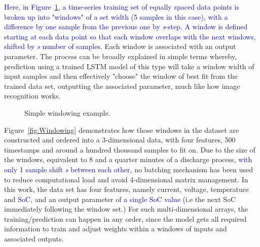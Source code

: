 %
%
\textcolor{blue}{Here, in Figure~\ref{fig:windowing_simple}, a time-series training set of equally spaced data points is broken up into "windows" of a set width (5 samples in this case), with a difference by one sample from the previous one by \textit{s}-step.
A window is defined starting at each data point so that each window overlaps with the next windows, shifted by \textit{s} number of samples.}
Each window is associated with an output parameter.
The process can be broadly explained in simple terms whereby, prediction using a trained LSTM model of this type will take a window width of input samples and then effectively "choose" the window of best fit from the trained data set, outputting the associated parameter, much like how image recognition works.
\begin{figure}[hbp]
    \centering
    
    \caption{Simple windowing example.}
    \label{fig:windowing_simple}
\end{figure}

\mbox{Figure~\ref{fig:Windowing}} demonstrates how those windows in the dataset are constructed and ordered into a 3-dimensional data, with four features, 500 timestamps and around a hundred thousand samples to fit on.
Due to the size of the windows, equivalent to 8 and a quarter minutes of a discharge process, \textcolor{blue}{with only 1 sample shift \textit{s} between each other}, no batching mechanism has been used to reduce computational load and avoid 4-dimensional matrix management.
In this work, the data set has four features, namely current, voltage, temperature and \textcolor{blue}{SoC}, and an output parameter of \textcolor{blue}{a single SoC value} (i.e the next SoC immediately following the window set.)
For such multi-dimensional arrays, the training/prediction can happen in any order, since the model gets all required information to train and adjust weights within a windows of inputs and associated outputs.

